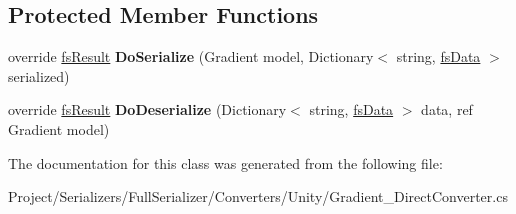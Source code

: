 \subsection*{Protected Member Functions}
\begin{DoxyCompactItemize}
\item 
\mbox{\label{class_full_serializer_1_1_internal_1_1_direct_converters_1_1_gradient___direct_converter_a9fdf07059a4318c6942e358749930ace}} 
override \hyperlink{struct_full_serializer_1_1fs_result}{fs\+Result} {\bfseries Do\+Serialize} (Gradient model, Dictionary$<$ string, \hyperlink{class_full_serializer_1_1fs_data}{fs\+Data} $>$ serialized)
\item 
\mbox{\label{class_full_serializer_1_1_internal_1_1_direct_converters_1_1_gradient___direct_converter_a73df87f1f589a688bbf15bf41f8e6f25}} 
override \hyperlink{struct_full_serializer_1_1fs_result}{fs\+Result} {\bfseries Do\+Deserialize} (Dictionary$<$ string, \hyperlink{class_full_serializer_1_1fs_data}{fs\+Data} $>$ data, ref Gradient model)
\end{DoxyCompactItemize}


The documentation for this class was generated from the following file\+:\begin{DoxyCompactItemize}
\item 
Project/\+Serializers/\+Full\+Serializer/\+Converters/\+Unity/Gradient\+\_\+\+Direct\+Converter.\+cs\end{DoxyCompactItemize}
